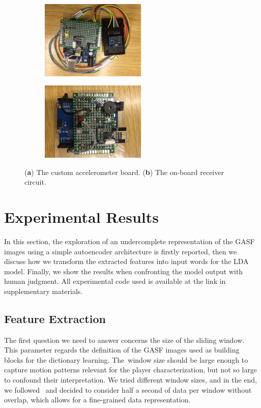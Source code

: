 {\begin{figure}[H]
\centering
\begin{subfigure}[b]{0.4\textwidth}
\includegraphics[width=5cm]{images/05-modeling/acc_board.jpg}
\caption{}
\label{figure:accelerometer}
\end{subfigure}
\begin{subfigure}[b]{0.4\textwidth}
\includegraphics[width=5cm]{images/05-modeling/tower_board.jpg} 
\caption{}
\label{figure:receiver}
\end{subfigure}
\caption{(\textbf{a}) The custom accelerometer board. (\textbf{b}) The on-board receiver circuit.}
\label{figure:circuits}
\end{figure} \unskip

\section{Experimental Results}
In this section, the exploration of an undercomplete representation of the GASF images using a simple autoencoder architecture is firstly reported, then we discuss how we transform the extracted features into input words for the LDA model. Finally, we show the results when confronting the model output with human judgment. All experimental code used is available at the link in supplementary materials. 

\subsection{Feature Extraction}

The first question we need to answer concerns the size of the sliding window. This parameter regards the definition of the GASF images used as building blocks for the dictionary learning. The~window size should be large enough to capture motion patterns relevant for the player characterization, but not so large to confound their interpretation. We tried different window sizes, and in the end, we followed~\cite{oliveira_activity_2017} and decided to consider half a second of data per window without overlap, which allows for a fine-grained data representation.

}
